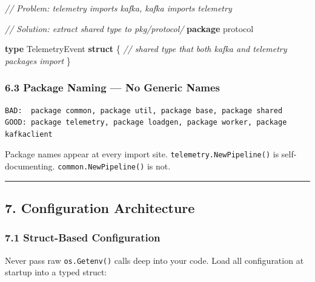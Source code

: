 \documentclass[
]{article}
\newenvironment{Shaded}{}{}
\newcommand{\CommentTok}[1]{\textcolor[rgb]{0.38,0.63,0.69}{\textit{#1}}}
\newcommand{\KeywordTok}[1]{\textcolor[rgb]{0.00,0.44,0.13}{\textbf{#1}}}
\newcommand{\NormalTok}[1]{#1}
\newcommand{\OperatorTok}[1]{\textcolor[rgb]{0.40,0.40,0.40}{#1}}
\begin{document}
\begin{Shaded}
\begin{Highlighting}[]
\CommentTok{// Problem: telemetry imports kafka, kafka imports telemetry}

\CommentTok{// Solution: extract shared type to pkg/protocol/}
\KeywordTok{package}\NormalTok{ protocol}

\KeywordTok{type}\NormalTok{ TelemetryEvent }\KeywordTok{struct} \OperatorTok{\{}
    \CommentTok{// shared type that both kafka and telemetry packages import}
\OperatorTok{\}}
\end{Highlighting}
\end{Shaded}

\hypertarget{package-naming-no-generic-names}{%
\subsubsection{6.3 Package Naming --- No Generic
Names}\label{package-naming-no-generic-names}}

\begin{verbatim}
BAD:  package common, package util, package base, package shared
GOOD: package telemetry, package loadgen, package worker, package kafkaclient
\end{verbatim}

Package names appear at every import site.
\texttt{telemetry.NewPipeline()} is self-documenting.
\texttt{common.NewPipeline()} is not.

\begin{center}\rule{0.5\linewidth}{0.5pt}\end{center}

\hypertarget{configuration-architecture}{%
\subsection{7. Configuration
Architecture}\label{configuration-architecture}}

\hypertarget{struct-based-configuration}{%
\subsubsection{7.1 Struct-Based
Configuration}\label{struct-based-configuration}}

Never pass raw \texttt{os.Getenv()} calls deep into your code. Load all
configuration at startup into a typed struct:
\end{document}
